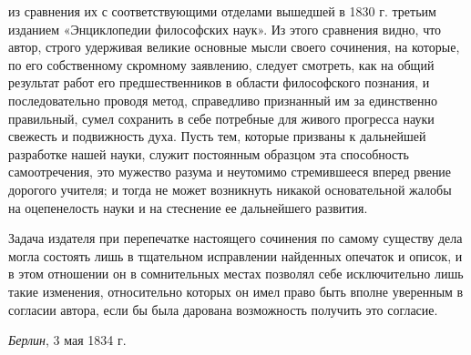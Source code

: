 из сравнения их с соответствующими отделами вышедшей в 1830 г. третьим
изданием «Энциклопедии философских наук». Из этого сравнения видно, что
автор, строго удерживая великие основные мысли своего сочинения, на
которые, по его собственному скромному заявлению, следует смотреть, как на
общий результат работ его предшественников в области философского познания,
и последовательно проводя метод, справедливо признанный им за единственно
правильный, сумел сохранить в себе потребные для живого прогресса науки
свежесть и подвижность духа. Пусть тем, которые призваны к дальнейшей
разработке нашей науки, служит постоянным образцом эта способность
самоотречения, это мужество разума и неутомимо стремившееся вперед рвение
дорогого учителя; и тогда не может возникнуть никакой основательной жалобы
на оцепенелость науки и на стеснение ее дальнейшего развития.

Задача издателя при перепечатке настоящего сочинения по самому существу дела
могла состоять лишь в тщательном исправлении найденных опечаток и описок, и
в этом отношении он в сомнительных местах позволял себе исключительно лишь
такие изменения, относительно которых он имел право быть вполне уверенным в
согласии автора, если бы была дарована возможность получить это согласие.

{\em Берлин}, 3 мая 1834 г.
